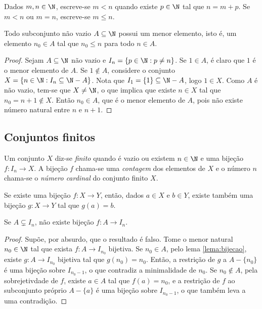 \documentclass{article}
\begin{document}
\begin{defn} [ordem em \(\N\)]
    Dados \(m, n \in \N\), escreve-se \(m < n\) quando existe \(p \in \N\) tal que \(n = m + p\). Se \(m < n\) ou \(m = n\), escreve-se \(m \leq n\).
\end{defn}

\begin{thm} 
    Todo subconjunto não vazio \(A \subseteq \N\) possui um menor elemento, isto é, um elemento \(n_0 \in A\) tal que \(n_0 \leq n\) para todo \(n \in A\).
\end{thm}

\begin{proof}
    Sejam \(A \subseteq \N\) não vazio e \(I_n = \{p \in \N: p \neq n\}\). Se \(1 \in A\), é claro que \(1\) é o menor elemento de \(A\). Se \(1 \notin A\), considere o conjunto \(X = \{n \in \N: I_n \subseteq \N - A\}\).
    Nota que \(I_1 = \{1\} \subseteq \N - A\), logo \(1 \in X\). Como \(A\) é não vazio, tem-se que \(X \neq \N\), o que implica que existe \(n \in X\) tal que \(n_0 = n+1 \notin X\). Então \(n_0 \in A\), que é o menor elemento de \(A\), pois não existe número natural entre \(n\) e \(n+1\).
\end{proof}

\subsection{Conjuntos finitos}

\begin{defn}
    Um conjunto \(X\) diz-se \emph{finito} quando é vazio ou existem \(n \in \N\) e uma bijeção \(f: I_n \to X\). A bijeção \(f\) chama-se uma \emph{contagem} dos elementos de \(X\) e o número \(n\) chama-se o \emph{número cardinal} do conjunto finito \(X\).
\end{defn}

\begin{lem} \label{lema:bijecao}
    Se existe uma bijeção \(f: X \to Y\), então, dados \(a \in X\) e \(b \in Y\), existe também uma bijeção \(g: X \to Y\) tal que \(g(a) = b\).
\end{lem}

\begin{thm}
    Se \(A \subsetneq I_n\), não existe bijeção \(f: A \to I_n\).
\end{thm}

\begin{proof}
    Supõe, por absurdo, que o resultado é falso. Tome o menor natural \(n_0 \in \N\) tal que exista \(f: A \to I_{n_0}\) bijetiva. Se \(n_0 \in A\), pelo lema \eqref{lema:bijecao}, existe \(g: A \to I_{n_0}\) bijetiva tal que \(g(n_0)=n_0\).
    Então, a restrição de \(g\) a \(A - \{n_0\}\) é uma bijeção sobre \(I_{n_0 -1}\), o que contradiz a minimalidade de \(n_0\). Se \(n_0 \notin A\), pela sobrejetivdade de \(f\), existe \(a \in A\) tal que \(f(a)=n_0\), e a restrição de \(f\) ao subconjunto próprio \(A - \{a\}\) é uma bijeção sobre \(I_{n_0 -1}\), o que também leva a uma contradição.
\end{proof}
\end{document}
